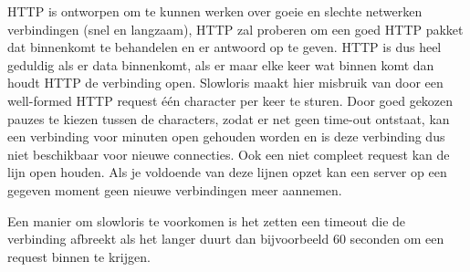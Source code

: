 HTTP is ontworpen om te kunnen werken over goeie en slechte netwerken verbindingen (snel en langzaam), HTTP zal proberen om een goed HTTP pakket dat binnenkomt te behandelen en er antwoord op te geven. HTTP is dus heel geduldig als er data binnenkomt, als er maar elke keer wat binnen komt dan houdt HTTP de verbinding open. Slowloris maakt hier misbruik van door een well-formed HTTP request \'e\'en character per keer te sturen. Door goed gekozen pauzes te kiezen tussen de characters, zodat er net geen time-out ontstaat, kan een verbinding voor minuten open gehouden worden en is deze verbinding dus niet beschikbaar voor nieuwe connecties. Ook een niet compleet request kan de lijn open houden. Als je voldoende van deze lijnen opzet kan een server op een gegeven moment geen nieuwe verbindingen meer aannemen.

Een manier om slowloris te voorkomen is het zetten een timeout die de verbinding afbreekt als het langer duurt dan bijvoorbeeld 60 seconden om een request binnen te krijgen.

